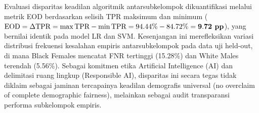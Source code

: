 Evaluasi disparitas keadilan algoritmik antarsubkelompok dikuantifikasi melalui metrik EOD berdasarkan selisih TPR maksimum dan minimum ($\text{EOD} = \Delta \text{TPR} = \max \text{TPR} - \min \text{TPR} = 94.44\% - 84.72\% = \mathbf{9.72}\text{\textbf{ pp}}$), yang bernilai identik pada model LR dan SVM. Kesenjangan ini merefleksikan variasi distribusi frekuensi kesalahan empiris antarsubkelompok pada data uji held-out, di mana Black Females mencatat FNR tertinggi (15.28\%) dan White Males terendah (5.56\%). Sebagai komitmen etika Artificial Intelligence (AI) dan delimitasi ruang lingkup (Responsible AI), disparitas ini secara tegas tidak diklaim sebagai jaminan tercapainya keadilan demografis universal (no overclaim of complete demographic fairness), melainkan sebagai audit transparansi performa subkelompok empiris.
